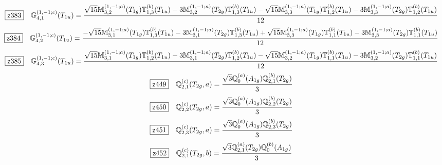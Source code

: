 \documentclass[fleqn,10pt,landscape]{jsarticle}
\begin{document}
\begin{dmath*}
\hspace*{3mm}\fbox{z383}\quad \mathbb{G}_{4,1}^{(1,-1;c)}(T_{1u})=\frac{\sqrt{15} \mathbb{M}_{3,2}^{(1,-1;a)}(T_{1g}) \mathbb{T}_{1,3}^{(b)}(T_{1u}) - 3 \mathbb{M}_{3,2}^{(1,-1;a)}(T_{2g}) \mathbb{T}_{1,3}^{(b)}(T_{1u}) - \sqrt{15} \mathbb{M}_{3,3}^{(1,-1;a)}(T_{1g}) \mathbb{T}_{1,2}^{(b)}(T_{1u}) - 3 \mathbb{M}_{3,3}^{(1,-1;a)}(T_{2g}) \mathbb{T}_{1,2}^{(b)}(T_{1u})}{12}
\end{dmath*}
\begin{dmath*}
\hspace*{3mm}\fbox{z384}\quad \mathbb{G}_{4,2}^{(1,-1;c)}(T_{1u})=\frac{- \sqrt{15} \mathbb{M}_{3,1}^{(1,-1;a)}(T_{1g}) \mathbb{T}_{1,3}^{(b)}(T_{1u}) - 3 \mathbb{M}_{3,1}^{(1,-1;a)}(T_{2g}) \mathbb{T}_{1,3}^{(b)}(T_{1u}) + \sqrt{15} \mathbb{M}_{3,3}^{(1,-1;a)}(T_{1g}) \mathbb{T}_{1,1}^{(b)}(T_{1u}) - 3 \mathbb{M}_{3,3}^{(1,-1;a)}(T_{2g}) \mathbb{T}_{1,1}^{(b)}(T_{1u})}{12}
\end{dmath*}
\begin{dmath*}
\hspace*{3mm}\fbox{z385}\quad \mathbb{G}_{4,3}^{(1,-1;c)}(T_{1u})=\frac{\sqrt{15} \mathbb{M}_{3,1}^{(1,-1;a)}(T_{1g}) \mathbb{T}_{1,2}^{(b)}(T_{1u}) - 3 \mathbb{M}_{3,1}^{(1,-1;a)}(T_{2g}) \mathbb{T}_{1,2}^{(b)}(T_{1u}) - \sqrt{15} \mathbb{M}_{3,2}^{(1,-1;a)}(T_{1g}) \mathbb{T}_{1,1}^{(b)}(T_{1u}) - 3 \mathbb{M}_{3,2}^{(1,-1;a)}(T_{2g}) \mathbb{T}_{1,1}^{(b)}(T_{1u})}{12}
\end{dmath*}
\begin{dmath*}
\hspace*{3mm}\fbox{z449}\quad \mathbb{Q}_{2,1}^{(c)}(T_{2g},a)=\frac{\sqrt{3} \mathbb{Q}_{0}^{(a)}(A_{1g}) \mathbb{Q}_{2,1}^{(b)}(T_{2g})}{3}
\end{dmath*}
\begin{dmath*}
\hspace*{3mm}\fbox{z450}\quad \mathbb{Q}_{2,2}^{(c)}(T_{2g},a)=\frac{\sqrt{3} \mathbb{Q}_{0}^{(a)}(A_{1g}) \mathbb{Q}_{2,2}^{(b)}(T_{2g})}{3}
\end{dmath*}
\begin{dmath*}
\hspace*{3mm}\fbox{z451}\quad \mathbb{Q}_{2,3}^{(c)}(T_{2g},a)=\frac{\sqrt{3} \mathbb{Q}_{0}^{(a)}(A_{1g}) \mathbb{Q}_{2,3}^{(b)}(T_{2g})}{3}
\end{dmath*}
\begin{dmath*}
\hspace*{3mm}\fbox{z452}\quad \mathbb{Q}_{2,1}^{(c)}(T_{2g},b)=\frac{\sqrt{3} \mathbb{Q}_{2,1}^{(a)}(T_{2g}) \mathbb{Q}_{0}^{(b)}(A_{1g})}{3}
\end{dmath*}
\end{document}

